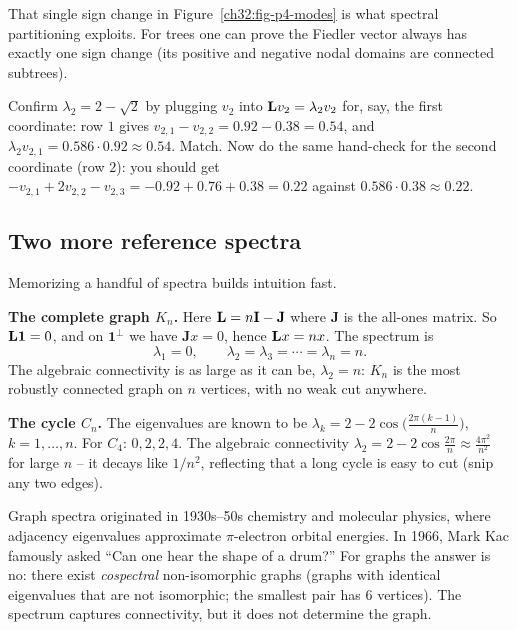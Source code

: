That single sign change in Figure~\ref{ch32:fig-p4-modes} is what spectral partitioning exploits. For trees one can prove the Fiedler vector always has exactly one sign change (its positive and negative nodal domains are connected subtrees).

\begin{labbox}
Confirm $\lambda_2=2-\sqrt2$ by plugging $v_2$ into $\mathbf{L} v_2=\lambda_2 v_2$ for, say, the first coordinate: row $1$ gives $v_{2,1}-v_{2,2}=0.92-0.38=0.54$, and $\lambda_2 v_{2,1}=0.586\cdot 0.92\approx 0.54$. Match. Now do the same hand-check for the second coordinate (row $2$): you should get $-v_{2,1}+2v_{2,2}-v_{2,3}=-0.92+0.76+0.38=0.22$ against $0.586\cdot 0.38\approx 0.22$.
\end{labbox}

\subsection{Two more reference spectra}

Memorizing a handful of spectra builds intuition fast.

\textbf{The complete graph $K_n$.} Here $\mathbf{L}=n\mathbf{I}-\mathbf{J}$ where $\mathbf{J}$ is the all-ones matrix. So $\mathbf{L}\mathbf{1}=0$, and on $\mathbf{1}^\perp$ we have $\mathbf{J}x=0$, hence $\mathbf{L} x=nx$. The spectrum is
\[
  \lambda_1=0,\qquad \lambda_2=\lambda_3=\cdots=\lambda_n=n.
\]
The algebraic connectivity is as large as it can be, $\lambda_2=n$: $K_n$ is the most robustly connected graph on $n$ vertices, with no weak cut anywhere.

\textbf{The cycle $C_n$.} The eigenvalues are known to be $\lambda_k=2-2\cos\!\big(\tfrac{2\pi(k-1)}{n}\big)$, $k=1,\dots,n$. For $C_4$: $0,2,2,4$. The algebraic connectivity $\lambda_2=2-2\cos\tfrac{2\pi}{n}\approx \tfrac{4\pi^2}{n^2}$ for large $n$ -- it decays like $1/n^2$, reflecting that a long cycle is easy to cut (snip any two edges).

\begin{marginnotebox}
Graph spectra originated in 1930s--50s chemistry and molecular physics, where adjacency eigenvalues approximate $\pi$-electron orbital energies. In 1966, Mark Kac famously asked ``Can one hear the shape of a drum?'' For graphs the answer is no: there exist \emph{cospectral} non-isomorphic graphs (graphs with identical eigenvalues that are not isomorphic; the smallest pair has $6$ vertices). The spectrum captures connectivity, but it does not determine the graph.
\end{marginnotebox}

